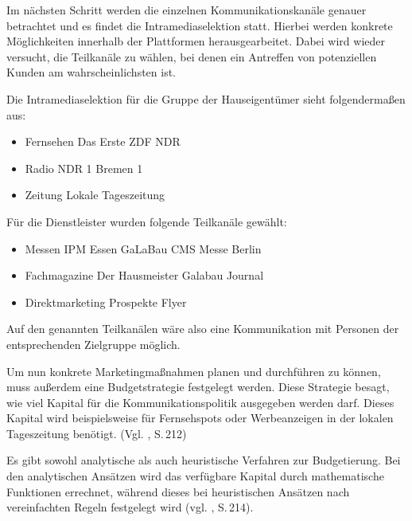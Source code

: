     \noindent
    Im nächsten Schritt werden die einzelnen Kommunikationskanäle genauer betrachtet und es findet die
    Intramediaselektion statt. Hierbei werden konkrete Möglichkeiten innerhalb der Plattformen herausgearbeitet. Dabei
    wird wieder versucht, die Teilkanäle zu wählen, bei denen ein Antreffen von potenziellen Kunden am
    wahrscheinlichsten ist.

    \noindent
    Die Intramediaselektion für die Gruppe der Hauseigentümer sieht folgendermaßen aus:

    \begin{itemize}
        \item Fernsehen
            \subitem Das Erste
            \subitem ZDF
            \subitem NDR
        \item Radio
            \subitem NDR 1
            \subitem Bremen 1
        \item Zeitung
            \subitem Lokale Tageszeitung
    \end{itemize}

    \noindent
    Für die Dienstleister wurden folgende Teilkanäle gewählt:

     \begin{itemize}
        \item Messen
            \subitem IPM Essen
            \subitem GaLaBau
            \subitem CMS Messe Berlin
        
        \item Fachmagazine
            \subitem Der Hausmeister
            \subitem Galabau Journal

        \item Direktmarketing
            \subitem Prospekte
            \subitem Flyer
     \end{itemize}

    \noindent
    Auf den genannten Teilkanälen wäre also eine Kommunikation mit Personen der entsprechenden Zielgruppe möglich.

    \noindent
    Um nun konkrete Marketingmaßnahmen planen und durchführen zu können, muss außerdem eine Budgetstrategie festgelegt
    werden. Diese Strategie besagt, wie viel Kapital für die Kommunikationspolitik ausgegeben werden darf. Dieses
    Kapital wird beispielsweise für Fernsehspots oder Werbeanzeigen in der lokalen Tageszeitung benötigt.
    (Vgl. \cite{Bruhn2014a}, S.\,212)

    \noindent
    Es gibt sowohl analytische als auch heuristische Verfahren zur Budgetierung. Bei den analytischen Ansätzen wird das
    verfügbare Kapital durch mathematische Funktionen errechnet, während dieses bei heuristischen Ansätzen nach
    vereinfachten Regeln festgelegt wird (vgl. \cite{Bruhn2014a}, S.\,214).

